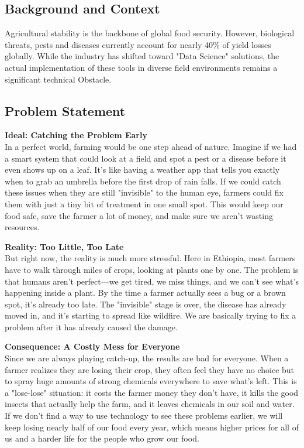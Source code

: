 \documentclass[12pt,a4paper]{article}
\begin{document}
\subsection{Background and Context}
Agricultural stability is the backbone of global food security. However, biological threats, pests and diseases currently account for nearly 40\% of yield losses globally. While the industry has shifted toward "Data Science" solutions, the actual implementation of these tools in diverse field environments remains a significant technical Obstacle.

\subsection{Problem Statement} 

\textbf{Ideal: Catching the Problem Early}\\
In a perfect world, farming would be one step ahead of nature. Imagine if we had a smart system that could look at a field and spot a pest or a disease before it even shows up on a leaf. It’s like having a weather app that tells you exactly when to grab an umbrella before the first drop of rain falls. If we could catch these issues when they are still "invisible" to the human eye, farmers could fix them with just a tiny bit of treatment in one small spot. This would keep our food safe, save the farmer a lot of money, and make sure we aren't wasting resources.

\textbf{Reality: Too Little, Too Late}\\
But right now, the reality is much more stressful. Here in Ethiopia, most farmers have to walk through miles of crops, looking at plants one by one. The problem is that humans aren't perfect—we get tired, we miss things, and we can't see what's happening inside a plant. By the time a farmer actually sees a bug or a brown spot, it’s already too late. The "invisible" stage is over, the disease has already moved in, and it's starting to spread like wildfire. We are basically trying to fix a problem after it has already caused the damage.

\textbf{Consequence: A Costly Mess for Everyone}\\
Since we are always playing catch-up, the results are bad for everyone. When a farmer realizes they are losing their crop, they often feel they have no choice but to spray huge amounts of strong chemicals everywhere to save what’s left. This is a "lose-lose" situation: it costs the farmer money they don't have, it kills the good insects that actually help the farm, and it leaves chemicals in our soil and water. If we don't find a way to use technology to see these problems earlier, we will keep losing nearly half of our food every year, which means higher prices for all of us and a harder life for the people who grow our food.
\end{document}
